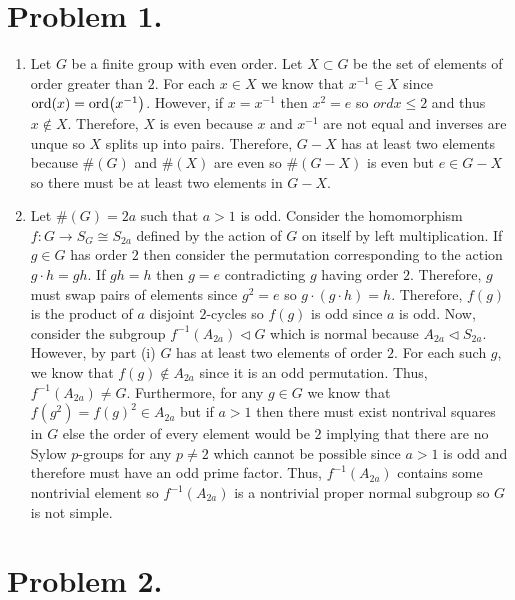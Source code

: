 \documentclass[12pt]{extarticle}
\begin{document}

\section*{Problem 1.}

\begin{enumerate}
\item Let $G$ be a finite group with even order. Let $X \subset G$ be the set of elements of order greater than $2$. For each $x \in X$ we know that $x^{-1} \in X$ since $\mathrm{ord}\! \left(x \right) = \mathrm{ord}\! \left(x^{-1} \right)$. However, if $x = x^{-1}$ then $x^2 = e$ so $ord{x} \le 2$ and thus $x \notin X$. Therefore, $X$ is even because $x$ and $x^{-1}$ are not equal and inverses are unque so $X$ splits up into pairs. Therefore, $G - X$ has at least two elements because $\#(G)$ and $\#(X)$ are even so $\#(G - X)$ is even but $e \in G - X$ so there must be at least two elements in $G - X$.

\item Let $\#(G) = 2a$ such that $a > 1$ is odd. Consider the homomorphism $f : G \to S_G \cong S_{2a}$ defined by the action of $G$ on itself by left multiplication. If $g \in G$ has order $2$ then consider the permutation corresponding to the action $g \cdot h = gh$. If $gh = h$ then $g = e$ contradicting $g$ having order $2$. Therefore, $g$ must swap pairs of elements since $g^2 = e$ so $g \cdot (g \cdot h) = h$. Therefore, $f(g)$ is the product of $a$ disjoint $2$-cycles so $f(g)$ is odd since $a$ is odd. Now, consider the subgroup $f^{-1}(A_{2a}) \triangleleft G$ which is normal because $A_{2a} \triangleleft S_{2a}$. However, by part (i) $G$ has at least two elements of order $2$. For each such $g$, we know that $f(g) \notin A_{2a}$ since it is an odd permutation. Thus, $f^{-1}(A_{2a}) \neq G$. Furthermore, for any $g \in G$ we know that $f(g^2) = f(g)^2 \in A_{2a}$ but if $a > 1$ then there must exist nontrival squares in $G$ else the order of every element would be $2$ implying that there are no Sylow $p$-groups for any $p \neq 2$ which cannot be possible since $a > 1$ is odd and therefore must have an odd prime factor. Thus, $f^{-1}(A_{2a})$ contains some nontrivial element so $f^{-1}(A_{2a})$ is a nontrivial proper normal subgroup so $G$ is not simple. 
\end{enumerate}

\section*{Problem 2.}
\end{document}
